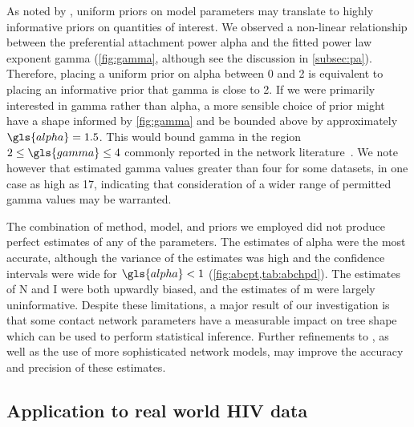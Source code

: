 As noted by \textcite{lintusaari2016identifiability}, uniform priors on model
parameters may translate to highly informative priors on quantities of
interest. We observed a non-linear relationship between the preferential
attachment power \gls{alpha} and the fitted power law exponent \gls{gamma}
(\cref{fig:gamma}, although see the discussion in \cref{subsec:pa}). Therefore,
placing a uniform prior on \gls{alpha} between 0 and 2 is equivalent to placing
an informative prior that \gls{gamma} is close to 2. If we were primarily
interested in \gls{gamma} rather than \gls{alpha}, a more sensible choice of
prior might have a shape informed by \cref{fig:gamma} and be bounded above by
approximately $\gls{alpha} = 1.5$. This would bound \gls{gamma} in the region
$2 \leq \gls{gamma} \leq 4$ commonly reported in the network
literature~\autocite{liljeros2001web, schneeberger2004scale, colgate1989risk,
clemenccon2015statistical, brown2011transmission}. We note however that
\textcite{jones2003assessment} estimated \gls{gamma} values greater than four
for some datasets, in one case as high as 17, indicating that consideration of
a wider range of permitted \gls{gamma} values may be warranted.

The combination of method, model, and priors we employed did not produce
perfect estimates of any of the parameters. The estimates of \gls{alpha} were
the most accurate, although the variance of the estimates was high and the
confidence intervals were wide for $\gls{alpha} < 1$
(\cref{fig:abcpt,tab:abchpd}). The estimates of \gls{N} and \gls{I} were both
upwardly biased, and the estimates of \gls{m} were largely uninformative.
Despite these limitations, a major result of our investigation is that some
contact network parameters have a measurable impact on tree shape which can be
used to perform statistical inference. Further refinements to
, as well as the use of more sophisticated network models, may
improve the accuracy and precision of these estimates.

\subsection{Application to real world HIV data}

